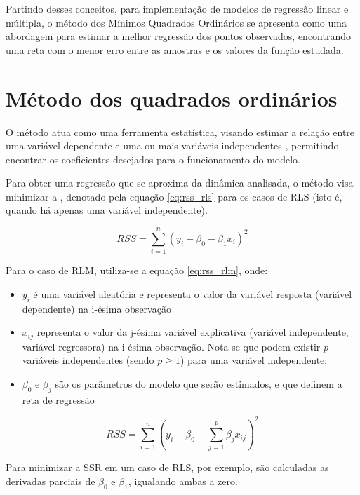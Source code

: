 Partindo desses conceitos, para implementação de modelos de regressão linear e múltipla, o método dos Mínimos Quadrados Ordinários se apresenta como uma abordagem para estimar a melhor regressão dos pontos observados, encontrando uma reta com o menor erro entre as amostras e os valores da função estudada.

\section{Método dos quadrados ordinários}

O método  atua como uma ferramenta estatística, visando estimar a relação entre uma variável dependente e uma ou mais variáveis independentes \cite{Alkama2020}, permitindo encontrar os coeficientes desejados para o funcionamento do modelo.

Para obter uma regressão que se aproxima da dinâmica analisada, o método visa minimizar a , denotado pela equação \ref{eq:rss_rls} para os casos de RLS (isto é, quando há apenas uma variável independente).

\begin{equation}
	RSS = \sum_{i=1}^{n} \left(y_i - \beta_0 - \beta_1x_{i}\right)^2
	\label{eq:rss_rls}
\end{equation}

Para o caso de \gls{RLM}, utiliza-se a equação \ref{eq:rss_rlm}, onde:

\begin{itemize}
    \item $y_i$ é uma variável aleatória e representa o valor da variável resposta (variável dependente) na i-ésima observação
    \item $x_{ij}$ representa o valor da j-ésima variável explicativa (variável independente, variável regressora) na i-ésima observação. Nota-se que podem existir $p$ variáveis independentes (sendo $p \geq 1$) para uma variável independente; 
    \item $\beta_{0}$ e $\beta_{j}$ são os parâmetros do modelo que serão estimados, e que definem a reta de regressão
\end{itemize}

\begin{equation}
    RSS = \sum_{i=1}^{n} \left(y_i - \beta_0 - \sum_{j=1}^{p}\beta_jx_{ij}\right)^2
	\label{eq:rss_rlm}
\end{equation}

Para minimizar a SSR em um caso de RLS, por exemplo, são calculadas as derivadas parciais de $\beta_0$ e $\beta_1$, igualando ambas a zero.

